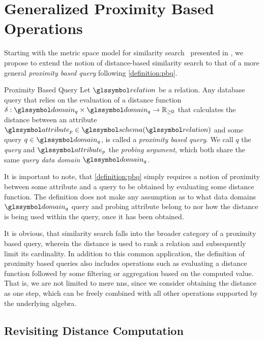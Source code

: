 \section{Generalized Proximity Based Operations}

Starting with the metric space model for similarity search~\cite{Zezula:2006similarity} presented in , we propose to extend the notion of distance-based similarity search to that of a more general \emph{proximity based query} following \cref{definition:pbq}.

\begin{definition}[label=definition:pbq]{Proximity Based Query}{}
    Let $\relation$ be a relation. Any database query that relies on the evaluation of a distance function $\delta: \domain_q \times \domain_q \rightarrow \mathbb{R}_{\geq 0}$ that calculates the distance between an attribute $\attribute_{p} \in \schema(\relation)$ and some query $q \in \domain_q$, is called a \emph{proximity based query}. We call $q$ the \emph{query} and $\attribute_{p}$ the \emph{probing argument}, which both share the same \emph{query data domain} $\domain_q$.
\end{definition}

It is important to note, that \cref{definition:pbq} simply requires a notion of proximity between some attribute and a query to be obtained by evaluating some distance function. The definition does not make any assumption as to what data domains $\domain_q$ query and probing attribute belong to nor how the distance is being used within the query, once it has been obtained. 

It is obvious, that similarity search falls into the broader category of a proximity based query, wherein the distance is used to rank a relation and subsequently limit its cardinality. In addition to this common application, the definition of proximity based queries also includes operations such as evaluating a distance function followed by some filtering or aggregation based on the computed value. That is, we are not limited to mere \acrshort{nns}, since we consider obtaining the distance as one step, which can be freely combined with all other operations supported by the underlying algebra.

\subsection{Revisiting Distance Computation}

